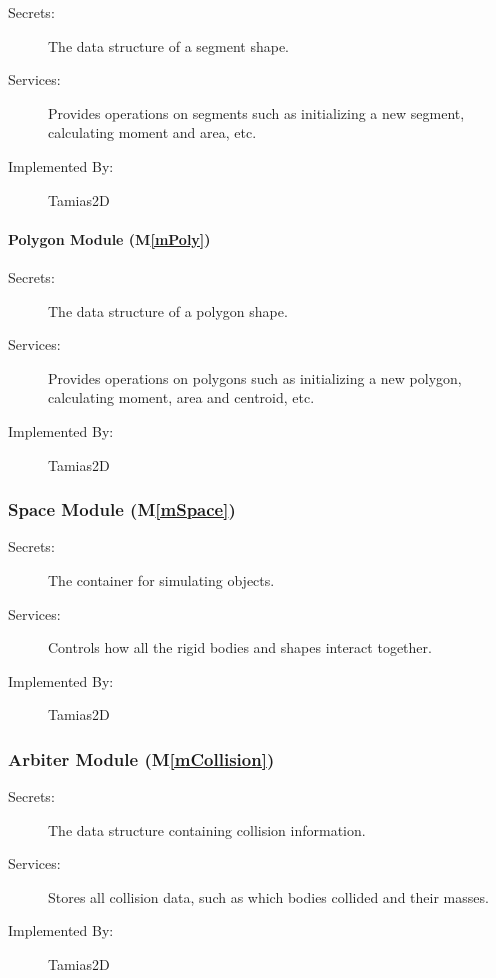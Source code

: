 \documentclass[12pt]{article}
\newcommand{\mref}[1]{M\ref{#1}}
\newcommand{\progname}{Tamias2D}
\begin{document}
\begin{description}
	\item[Secrets:] The data structure of a segment shape.
	\item[Services:] Provides operations on segments such as initializing a new segment, calculating moment and area, etc.
	\item[Implemented By:] \progname
\end{description}

\paragraph{Polygon Module (\mref{mPoly})}

\begin{description}
	\item[Secrets:] The data structure of a polygon shape.
	\item[Services:] Provides operations on polygons such as initializing a new polygon, calculating moment, area and centroid, etc.
	\item[Implemented By:] \progname
\end{description}

\subsubsection{Space Module (\mref{mSpace})}

\begin{description}
	\item[Secrets:] The container for simulating objects.
	\item[Services:]Controls how all the rigid bodies and shapes interact together.
	\item[Implemented By:] \progname
\end{description} 

\subsubsection{Arbiter Module (\mref{mCollision})}

\begin{description}
\item[Secrets:]The data structure containing collision information.
\item[Services:]Stores all collision data, such as which bodies 
collided and their masses.
\item[Implemented By:] \progname
\end{description}
 
\end{document}
